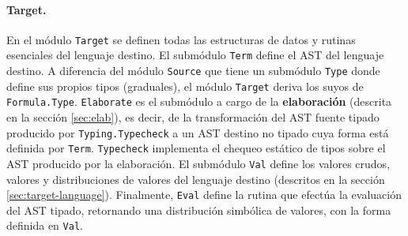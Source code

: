 \paragraph{Target.} En el módulo \verb|Target| se definen todas las
estructuras de datos y rutinas esenciales del lenguaje destino. El submódulo \verb|Term| define el AST del lenguaje destino. A diferencia
del módulo \verb|Source| que tiene un submódulo \verb|Type| donde define sus propios tipos (graduales), el módulo \verb|Target| deriva los suyos de \verb|Formula.Type|. \verb|Elaborate| es el submódulo a cargo de la \textbf{elaboración} (descrita en la sección \ref{sec:elab}), es decir, de la transformación del AST fuente tipado producido por \verb|Typing.Typecheck| a un AST destino no tipado cuya forma está definida por \verb|Term|. \verb|Typecheck| implementa el chequeo estático de tipos sobre el AST producido por la elaboración. El submódulo \verb|Val| define los valores crudos, valores y distribuciones de valores del lenguaje destino (descritos en la sección \ref{sec:target-language}). Finalmente, \verb|Eval| define la rutina que efectúa la evaluación del AST tipado, retornando una distribución simbólica de valores, con la forma definida en \verb|Val|. 

